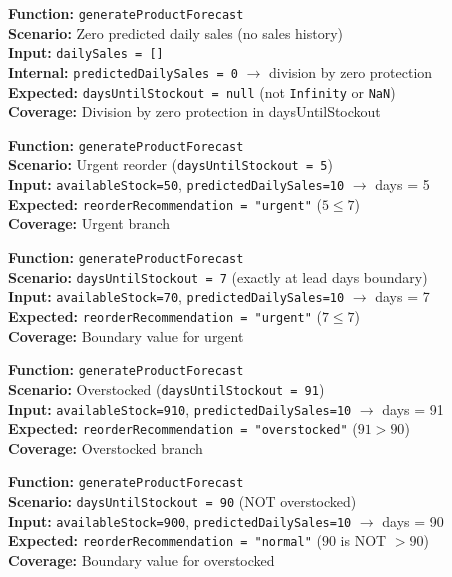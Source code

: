 \documentclass[12pt,onecolumn]{IEEEtran}
\begin{document}
\textbf{Function:} \texttt{generateProductForecast} \\
\textbf{Scenario:} Zero predicted daily sales (no sales history) \\
\textbf{Input:} \texttt{dailySales = []} \\
\textbf{Internal:} \texttt{predictedDailySales = 0} $\to$ division by zero protection \\
\textbf{Expected:} \texttt{daysUntilStockout = null} (not \texttt{Infinity} or \texttt{NaN}) \\
\textbf{Coverage:} Division by zero protection in daysUntilStockout



\textbf{Function:} \texttt{generateProductForecast} \\
\textbf{Scenario:} Urgent reorder (\texttt{daysUntilStockout = 5}) \\
\textbf{Input:} \texttt{availableStock=50}, \texttt{predictedDailySales=10} $\to$ days = 5 \\
\textbf{Expected:} \texttt{reorderRecommendation = "urgent"} ($5 \leq 7$) \\
\textbf{Coverage:} Urgent branch



\textbf{Function:} \texttt{generateProductForecast} \\
\textbf{Scenario:} \texttt{daysUntilStockout = 7} (exactly at lead days boundary) \\
\textbf{Input:} \texttt{availableStock=70}, \texttt{predictedDailySales=10} $\to$ days = 7 \\
\textbf{Expected:} \texttt{reorderRecommendation = "urgent"} ($7 \leq 7$) \\
\textbf{Coverage:} Boundary value for urgent



\textbf{Function:} \texttt{generateProductForecast} \\
\textbf{Scenario:} Overstocked (\texttt{daysUntilStockout = 91}) \\
\textbf{Input:} \texttt{availableStock=910}, \texttt{predictedDailySales=10} $\to$ days = 91 \\
\textbf{Expected:} \texttt{reorderRecommendation = "overstocked"} ($91 > 90$) \\
\textbf{Coverage:} Overstocked branch



\textbf{Function:} \texttt{generateProductForecast} \\
\textbf{Scenario:} \texttt{daysUntilStockout = 90} (NOT overstocked) \\
\textbf{Input:} \texttt{availableStock=900}, \texttt{predictedDailySales=10} $\to$ days = 90 \\
\textbf{Expected:} \texttt{reorderRecommendation = "normal"} ($90$ is NOT $> 90$) \\
\textbf{Coverage:} Boundary value for overstocked
\end{document}
